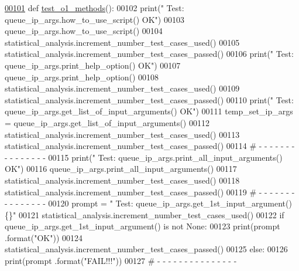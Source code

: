 \begin{DoxyCode}
\hypertarget{classutilities_1_1queue__ip__arguments__tester_1_1queue__ip__args__tester_l00101}{}\hyperlink{classutilities_1_1queue__ip__arguments__tester_1_1queue__ip__args__tester_a49bd049dbf616cc1f604d3c0cbe84c43}{00101}     \textcolor{keyword}{def }\hyperlink{classutilities_1_1queue__ip__arguments__tester_1_1queue__ip__args__tester_a49bd049dbf616cc1f604d3c0cbe84c43}{test\_o1\_methods}():
00102         print(\textcolor{stringliteral}{" Test: queue\_ip\_args.how\_to\_use\_script()         OK"})
00103         queue\_ip\_args.how\_to\_use\_script()
00104         statistical\_analysis.increment\_number\_test\_cases\_used()
00105         statistical\_analysis.increment\_number\_test\_cases\_passed()
00106         print(\textcolor{stringliteral}{" Test: queue\_ip\_args.print\_help\_option()         OK"})
00107         queue\_ip\_args.print\_help\_option()
00108         statistical\_analysis.increment\_number\_test\_cases\_used()
00109         statistical\_analysis.increment\_number\_test\_cases\_passed()
00110         print(\textcolor{stringliteral}{" Test: queue\_ip\_args.get\_list\_of\_input\_arguments()   OK"})
00111         temp\_set\_ip\_args = queue\_ip\_args.get\_list\_of\_input\_arguments()
00112         statistical\_analysis.increment\_number\_test\_cases\_used()
00113         statistical\_analysis.increment\_number\_test\_cases\_passed()
00114         \textcolor{comment}{#   -   -   -   -   -   -   -   -   -   -   -   -   -   -   -}
00115         print(\textcolor{stringliteral}{" Test: queue\_ip\_args.print\_all\_input\_arguments()     OK"})
00116         queue\_ip\_args.print\_all\_input\_arguments()
00117         statistical\_analysis.increment\_number\_test\_cases\_used()
00118         statistical\_analysis.increment\_number\_test\_cases\_passed()
00119         \textcolor{comment}{#   -   -   -   -   -   -   -   -   -   -   -   -   -   -   -}
00120         prompt = \textcolor{stringliteral}{"  Test: queue\_ip\_args.get\_1st\_input\_argument()        \{\}"}
00121         statistical\_analysis.increment\_number\_test\_cases\_used()
00122         \textcolor{keywordflow}{if} queue\_ip\_args.get\_1st\_input\_argument() \textcolor{keywordflow}{is} \textcolor{keywordflow}{not} \textcolor{keywordtype}{None}:
00123             print(prompt .format(\textcolor{stringliteral}{"OK"}))
00124             statistical\_analysis.increment\_number\_test\_cases\_passed()
00125         \textcolor{keywordflow}{else}:
00126             print(prompt .format(\textcolor{stringliteral}{"FAIL!!!"}))
00127         \textcolor{comment}{#   -   -   -   -   -   -   -   -   -   -   -   -   -   -   -}

\end{DoxyCode}
